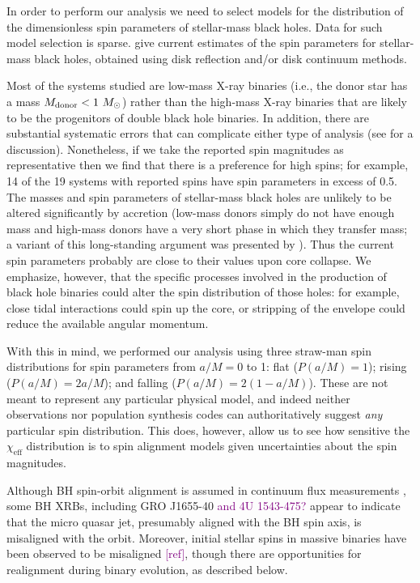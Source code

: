 \documentclass[modern,linenumbers]{aastex61}
\newcommand{\chieff}{\chi_\mathrm{eff}}
\newcommand{\ilya}[1]{\textcolor{purple}{#1}}
\begin{document}
In order to perform our analysis we need to select models for the
distribution of the dimensionless spin parameters of stellar-mass
black holes.  Data for such model selection is sparse.
\citet{2015PhR...548....1M} give current estimates of the spin
parameters for stellar-mass black holes, obtained using disk
reflection and/or disk continuum methods.

Most of the systems studied are low-mass X-ray binaries (i.e., the
donor star has a mass $M_{\rm donor}<1~M_\odot$) rather than the
high-mass X-ray binaries that are likely to be the progenitors of
double black hole binaries.  In addition, there are substantial
systematic errors that can complicate either type of analysis (see
\citealt{2015PhR...548....1M} for a discussion). Nonetheless, if we
take the reported spin magnitudes as representative then we find that
there is a preference for high spins; for example, 14 of the 19
systems with reported spins have spin parameters in excess of 0.5.
The masses and spin parameters of stellar-mass black holes are
unlikely to be altered significantly by accretion (low-mass donors
simply do not have enough mass and high-mass donors have a very short
phase in which they transfer mass; a variant of this long-standing
argument was presented by \citet{1999MNRAS.305..654K}).  Thus the
current spin parameters probably are close to their values upon core
collapse.  We emphasize, however, that the specific processes involved
in the production of black hole binaries could alter the spin
distribution of those holes: for example, close tidal interactions
could spin up the core, or stripping of the envelope could reduce the
available angular momentum.

With this in mind, we performed our analysis using three straw-man
spin distributions for spin parameters from $a/M=0$ to 1: flat
($P(a/M)=1$); rising ($P(a/M)=2a/M$); and falling ($P(a/M)=2(1-a/M)$).
These are not meant to represent any particular physical model, and
indeed neither observations nor population synthesis codes can
authoritatively suggest {\it any} particular spin distribution.  This
does, however, allow us to see how sensitive the $\chieff$
distribution is to spin alignment models given uncertainties about the
spin magnitudes.

Although BH spin-orbit alignment is assumed in continuum flux
measurements \citep{2015PhR...548....1M}, some BH XRBs, including GRO
J1655-40 \ilya{and 4U 1543-475?} appear to indicate that the micro
quasar jet, presumably aligned with the BH spin axis, is misaligned
with the orbit.  Moreover, initial stellar spins in massive binaries
have been observed to be misaligned \ilya{[ref]}, though there are
opportunities for realignment during binary evolution, as described
below.
\end{document}
